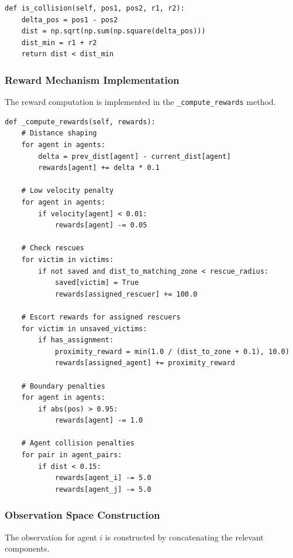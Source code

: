 \documentclass[11pt,a4paper]{article}
\begin{document}
\begin{lstlisting}[caption={Collision detection implementation.},label={lst:collision}]
def is_collision(self, pos1, pos2, r1, r2):
    delta_pos = pos1 - pos2
    dist = np.sqrt(np.sum(np.square(delta_pos)))
    dist_min = r1 + r2
    return dist < dist_min
\end{lstlisting}

\subsubsection{Reward Mechanism Implementation}
\label{subsubsec:reward_impl}

The reward computation is implemented in the \texttt{\_compute\_rewards} method.

\begin{lstlisting}[caption={Reward computation pseudocode.},label={lst:rewards}]
def _compute_rewards(self, rewards):
    # Distance shaping
    for agent in agents:
        delta = prev_dist[agent] - current_dist[agent]
        rewards[agent] += delta * 0.1

    # Low velocity penalty
    for agent in agents:
        if velocity[agent] < 0.01:
            rewards[agent] -= 0.05

    # Check rescues
    for victim in victims:
        if not saved and dist_to_matching_zone < rescue_radius:
            saved[victim] = True
            rewards[assigned_rescuer] += 100.0

    # Escort rewards for assigned rescuers
    for victim in unsaved_victims:
        if has_assignment:
            proximity_reward = min(1.0 / (dist_to_zone + 0.1), 10.0)
            rewards[assigned_agent] += proximity_reward

    # Boundary penalties
    for agent in agents:
        if abs(pos) > 0.95:
            rewards[agent] -= 1.0

    # Agent collision penalties
    for pair in agent_pairs:
        if dist < 0.15:
            rewards[agent_i] -= 5.0
            rewards[agent_j] -= 5.0
\end{lstlisting}

\subsubsection{Observation Space Construction}
\label{subsubsec:obs_construction}

The observation for agent $i$ is constructed by concatenating the relevant components.
\end{document}
